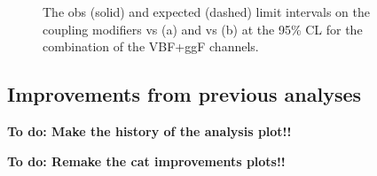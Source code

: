 \begin{figure}[ht]
	\centering
	\caption{The obs (solid) and expected (dashed) limit intervals on the coupling modifiers \kl vs \kvv (a) and \kv vs \kvv (b) at the 95\% CL for the combination of the VBF+ggF channels.
	}
	\label{fig:2d-lim}
\end{figure}

\subsection{Improvements from previous analyses}

\textbf{To do: Make the history of the analysis plot!!}

\textbf{To do: Remake the cat improvements plots!!}


